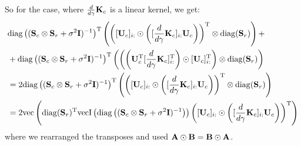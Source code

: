 \documentclass{article}
\newcommand{\B}[1]{{\bf{#1}}}
\begin{document}
So for the case, where $\dg \B{K}_c$ is a linear kernel, we get:
\begin{align}&
\nonumber
  \diag\left((\B{S}_c \otimes \B{S}_r + \sigma^2\B{I})^{-1}\right)^{\T} \left(
   \left([\B{U}_c]_{i:} \odot\left([\dg \B{K}_c]_{i:}
       \B{U}_c\right) \right) ^{\T} \otimes \diag(\B{S}_r)\right) +\\&
 +\diag\left((\B{S}_c \otimes \B{S}_r + \sigma^2\B{I})^{-1}\right)^{\T} \left(\left(
   \left(\B{U}_c^{\T} [\dg \B{K}_c]_{i:}^{\T} \right) \odot
   [\B{U}_c]_{i:}^{\T}\right) \otimes \diag(\B{S}_r)\right) 
\\&
=   2\diag\left((\B{S}_c \otimes \B{S}_r + \sigma^2\B{I})^{-1}\right)^{\T} \left(
   \left([\B{U}_c]_{i:} \odot\left([\dg \B{K}_c]_{i:}
       \B{U}_c\right) \right) ^{\T} \otimes \diag(\B{S}_r)\right)
\\&
=   2 \col\left(\diag(\B{S}_r)^{\T}\colI\left(\diag\left((\B{S}_c \otimes \B{S}_r + \sigma^2\B{I})^{-1}\right)\right) 
   \left([\B{U}_c]_{i:} \odot\left([\dg \B{K}_c]_{i:}
       \B{U}_c\right) \right) ^{\T}\right) 
\end{align}
where we rearranged the transposes and used ${\bf A}\odot{\bf B}={\bf B}\odot{\bf A}$.
\end{document}
